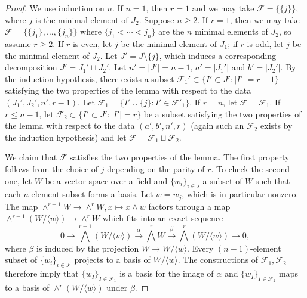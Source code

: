 \documentclass{article} %
\numberwithin{equation}{section}
\begin{document}
\begin{proof}
    We use induction on $n$.
    If $n=1$, then $r=1$ and we may take $\mathcal{F} = \{\{j\}\}$, where $j$ is the minimal element of $J_2$.
    Suppose $n\geq 2$. 
    If $r=1$, then we may take $\mathcal{F} = \{\{j_1\}, \dots, \{j_n\}\}$ where $\{j_1< \cdots <  j_n\}$ are the $n$ minimal elements of $J_2$, so assume $r\geq 2$.
    If $r$ is even, let $j$ be the minimal element of $J_1$; if $r$ is odd, let $j$ be the minimal element of $J_2$.
    Let $J' = J\setminus \{j\}$, which induces a corresponding decomposition $J ' = J_1' \sqcup J_2'$. 
    Let $n' = |J'| = n-1$, $a' = |J_1'|$ and $b' = |J_2'|$.
    By the induction hypothesis, there exists a subset $\mathcal{F}_1' \subset \{I' \subset J' \colon |I'| = r-1\}$ satisfying the two properties of the lemma with respect to the data $(J_1',J_2',n',r-1)$.
    Let $\mathcal{F}_1 = \{ I' \cup \{j\} \colon I' \in \mathcal{F}'_1\}$.
    If $r=n$, let $\mathcal{F} = \mathcal{F}_1$.
    If $r\leq n-1$, let $\mathcal{F}_2\subset \{I' \subset J' \colon |I'| = r\}$ be a subset satisfying the two properties of the lemma with respect to the data $(a',b',n',r)$ (again such an $\mathcal{F}_2$ exists by the induction hypothesis) and let $\mathcal{F} = \mathcal{F}_1\sqcup \mathcal{F}_2$.

    We claim that $\mathcal{F}$ satisfies the two properties of the lemma. 
    The first property follows from the choice of $j$ depending on the parity of $r$.
    To check the second one, let $W$ be a vector space over a field and $\{w_i\}_{i \in J}$ a subset of $W$ such that each $n$-element subset forms a basis.
    Let $w = w_j$, which is in particular nonzero.
    The map $\wedge^{r-1}W \rightarrow \wedge^r W, x\mapsto x\wedge w$ factors through a map $\wedge^{r-1}(W/\langle w\rangle)\rightarrow \wedge^r W$ which fits into an exact sequence
    \[
    0 \rightarrow \bigwedge^{r-1}(W/\langle w\rangle) \xrightarrow{\alpha} \bigwedge^r W \xrightarrow{\beta} \bigwedge^r(W/\langle w \rangle ) \rightarrow 0,
    \]
    where $\beta$ is induced by the projection $W\rightarrow W/\langle w\rangle$. 
    Every $(n-1)$-element subset of $\{w_i\}_{i\in J'}$ projects to a basis of $W/\langle w\rangle$.
    The constructions of $\mathcal{F}_1, \mathcal{F}_2$ therefore imply that $\{w_I\}_{I\in \mathcal{F}_1}$ is a basis for the image of $\alpha$ and $\{w_I\}_{I \in \mathcal{F}_2}$ maps to a basis of $\wedge^r(W/\langle w\rangle)$ under $\beta$.
\end{proof}
\end{document}
